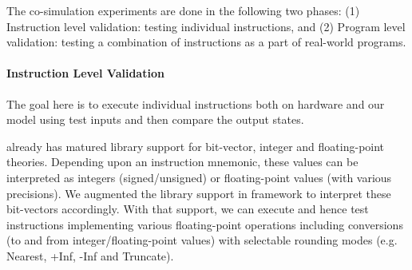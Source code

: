 The co-simulation experiments are done in the following two phases: (1) Instruction level validation: testing individual instructions, and (2) Program level validation: testing a combination of instructions  as a part of real-world programs. 

\vspace{-2pt}
\paragraph{Instruction Level Validation}

The goal here is to execute individual instructions both on hardware and our model using test inputs and then compare the output states. 

\K already has matured library support for bit-vector, integer and floating-point theories.  Depending upon an instruction mnemonic, these values can be interpreted as integers (signed/unsigned) or floating-point values (with various precisions).  We augmented the library support in \K framework to interpret these bit-vectors accordingly. With that support, we can execute and hence test instructions implementing various floating-point operations including conversions (to and from integer/floating-point values) with selectable rounding modes (e.g. Nearest, +Inf, -Inf and Truncate).   

